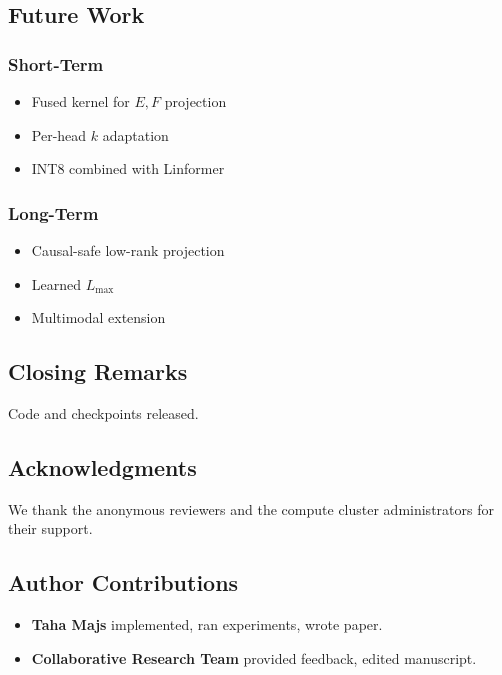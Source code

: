 \subsection{Future Work}

\subsubsection{Short-Term}
\begin{itemize}
\item Fused kernel for $E, F$ projection
\item Per-head $k$ adaptation
\item INT8 combined with Linformer

\end{itemize}
\subsubsection{Long-Term}
\begin{itemize}
\item Causal-safe low-rank projection
\item Learned $L_\text{max}$
\item Multimodal extension

\end{itemize}
\subsection{Closing Remarks}

Code and checkpoints released.

\subsection{Acknowledgments}

We thank the anonymous reviewers and the compute cluster administrators for their support.

\subsection{Author Contributions}

\begin{itemize}
\item \textbf{Taha Majs} implemented, ran experiments, wrote paper.
\item \textbf{Collaborative Research Team} provided feedback, edited manuscript.

\end{itemize}
